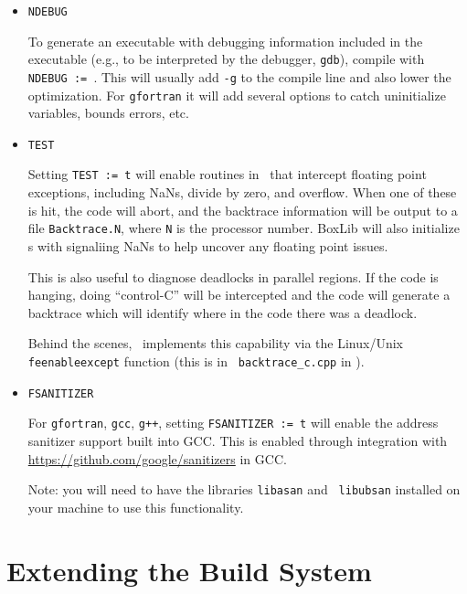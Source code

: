 \begin{itemize}

\item {\tt NDEBUG} 

   To generate an executable
  with debugging information included in the executable (e.g., to be
  interpreted by the debugger, {\tt gdb}), compile with {\tt NDEBUG
    :=\ }.  This will usually add {\tt -g} to the compile line and
  also lower the optimization.  For {\tt gfortran} it will add several
  options to catch uninitialize variables, bounds errors, etc.


\item {\tt TEST}

  Setting {\tt TEST := t} will
  enable routines in \boxlib\ that intercept floating point
  exceptions, including NaNs, divide by zero, and overflow.  When one
  of these is hit, the code will abort, and the backtrace information
  will be output to a file {\tt Backtrace.N}, where {\tt N} is the
  processor number.  BoxLib will also initialize \multifab s with
  signaliing NaNs to help uncover any floating point issues.

  This is also useful to diagnose deadlocks in parallel regions.
  If the code is hanging, doing ``control-C'' will be intercepted
  and the code will generate a backtrace which will identify
  where in the code there was a deadlock.

  Behind the scenes, \boxlib\ implements this capability via the
  Linux/Unix {\tt feenableexcept} function (this is in {\tt
    backtrace\_c.cpp} in \boxlib).

\item {\tt FSANITIZER}

  For {\tt gfortran}, {\tt gcc}, {\tt g++}, setting {\tt FSANITIZER :=
    t} will enable the
  address sanitizer support built into GCC.  This is enabled through
  integration with \url{https://github.com/google/sanitizers} in GCC.

  Note: you will need to have the libraries {\tt libasan} and {\tt
    libubsan} installed on your machine to use this functionality.

\end{itemize}


\section{Extending the Build System}

